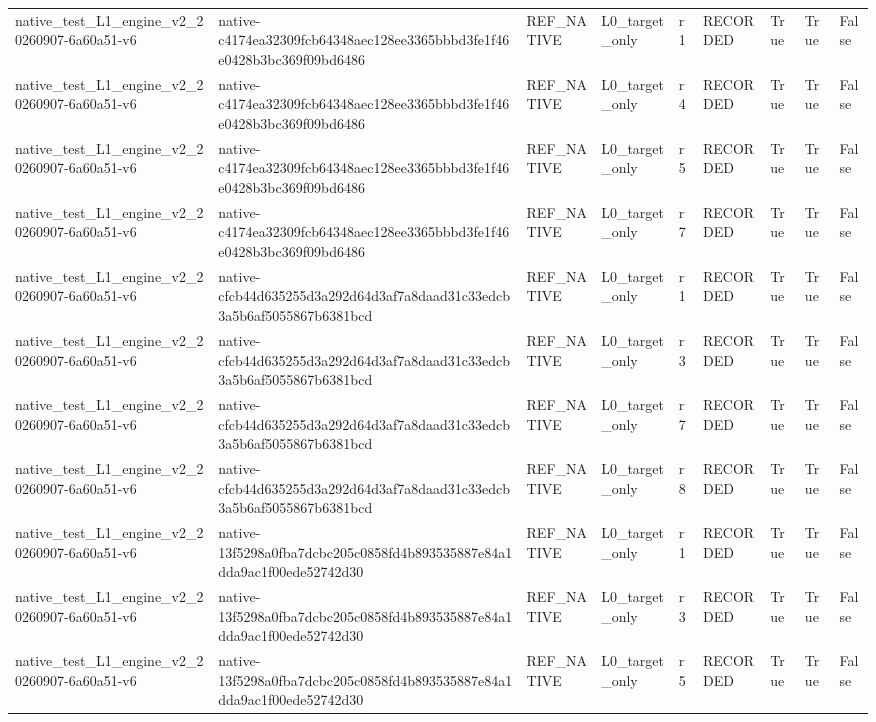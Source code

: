 \begin{tabular}{lllllllll}
native\_test\_L1\_engine\_v2\_20260907-6a60a51-v6 & native-c4174ea32309fcb64348aec128ee3365bbbd3fe1f46e0428b3bc369f09bd6486 & REF\_NATIVE & L0\_target\_only & r1 & RECORDED & True & True & False \\
native\_test\_L1\_engine\_v2\_20260907-6a60a51-v6 & native-c4174ea32309fcb64348aec128ee3365bbbd3fe1f46e0428b3bc369f09bd6486 & REF\_NATIVE & L0\_target\_only & r4 & RECORDED & True & True & False \\
native\_test\_L1\_engine\_v2\_20260907-6a60a51-v6 & native-c4174ea32309fcb64348aec128ee3365bbbd3fe1f46e0428b3bc369f09bd6486 & REF\_NATIVE & L0\_target\_only & r5 & RECORDED & True & True & False \\
native\_test\_L1\_engine\_v2\_20260907-6a60a51-v6 & native-c4174ea32309fcb64348aec128ee3365bbbd3fe1f46e0428b3bc369f09bd6486 & REF\_NATIVE & L0\_target\_only & r7 & RECORDED & True & True & False \\
native\_test\_L1\_engine\_v2\_20260907-6a60a51-v6 & native-cfcb44d635255d3a292d64d3af7a8daad31c33edcb3a5b6af5055867b6381bcd & REF\_NATIVE & L0\_target\_only & r1 & RECORDED & True & True & False \\
native\_test\_L1\_engine\_v2\_20260907-6a60a51-v6 & native-cfcb44d635255d3a292d64d3af7a8daad31c33edcb3a5b6af5055867b6381bcd & REF\_NATIVE & L0\_target\_only & r3 & RECORDED & True & True & False \\
native\_test\_L1\_engine\_v2\_20260907-6a60a51-v6 & native-cfcb44d635255d3a292d64d3af7a8daad31c33edcb3a5b6af5055867b6381bcd & REF\_NATIVE & L0\_target\_only & r7 & RECORDED & True & True & False \\
native\_test\_L1\_engine\_v2\_20260907-6a60a51-v6 & native-cfcb44d635255d3a292d64d3af7a8daad31c33edcb3a5b6af5055867b6381bcd & REF\_NATIVE & L0\_target\_only & r8 & RECORDED & True & True & False \\
native\_test\_L1\_engine\_v2\_20260907-6a60a51-v6 & native-13f5298a0fba7dcbc205c0858fd4b893535887e84a1dda9ac1f00ede52742d30 & REF\_NATIVE & L0\_target\_only & r1 & RECORDED & True & True & False \\
native\_test\_L1\_engine\_v2\_20260907-6a60a51-v6 & native-13f5298a0fba7dcbc205c0858fd4b893535887e84a1dda9ac1f00ede52742d30 & REF\_NATIVE & L0\_target\_only & r3 & RECORDED & True & True & False \\
native\_test\_L1\_engine\_v2\_20260907-6a60a51-v6 & native-13f5298a0fba7dcbc205c0858fd4b893535887e84a1dda9ac1f00ede52742d30 & REF\_NATIVE & L0\_target\_only & r5 & RECORDED & True & True & False \\

\end{tabular}
